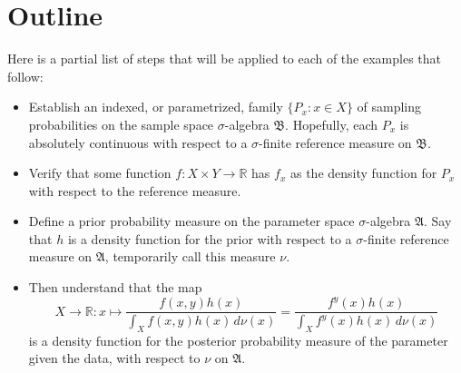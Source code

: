 \documentclass[
twoside=true,
paper=letter,
fontsize=9pt,
pagesize=auto,
leqno,
openany,
headsepline,
overfullrule,
]{scrbook}
\theoremstyle{plain}
\theoremstyle{plain}
\theoremstyle{definition}
\theoremstyle{bfnoteitalic}
\theoremstyle{bfnoteroman}
\newcommand{\sigalg}[1]{\mathfrak{#1}}
\newcommand{\textsigma}{\hbox{\large{$\sigma$}}\kern-1pt}
\newcommand{\R}{\mathbb{R}}
\newcommand{\funcf}{f}
\newcommand{\funch}{h}
\newcommand{\function}{f}
\newcommand{\functioniii}{h}
\newcommand{\measurespace}{X}
\newcommand{\measurespaceii}{Y}
\newcommand{\measureii}{\nu}
\newcommand{\measnu}{\nu}
\newcommand{\pspace}{\measurespace}%
\newcommand{\sspace}{\measurespaceii}%
\newcommand{\pspaceelt}{x}
\newcommand{\sspaceelt}{y}
\newcommand{\sspacesig}{\sigalg{B}}
\newcommand{\pspacesig}{\sigalg{A}}
\begin{document}
\section{Outline}
Here is a partial list of steps that will be applied to each of the examples that follow:
\begin{itemize}
\item
Establish an indexed, or parametrized, family
$\{ P_\pspaceelt :\pspaceelt\in\pspace \}$
of sampling probabilities on the sample space \textsigma-algebra 
$\sspacesig$. Hopefully, each
$P_\pspaceelt$
is absolutely continuous with respect to a \textsigma-finite reference measure on $\sspacesig$.
\item
Verify that some function
$\function : \pspace\times\sspace\to\R$
has $\funcf_\pspaceelt$ as  the density function for
$P_\pspaceelt$ with respect to the reference measure.
\item
Define a prior probability measure on the parameter space \textsigma-algebra
$\pspacesig$.
Say that $\funch$ is a density function for the prior with respect to a \textsigma-finite reference measure on $\pspacesig$, temporarily call this measure $\measnu$.
\item
Then understand that the map
\[
\pspace\to\R:
\pspaceelt
\mapsto
\frac{\function(\pspaceelt,\sspaceelt)\functioniii(\pspaceelt)}
{\displaystyle
\int_{\pspace} \function(\pspaceelt,\sspaceelt)\functioniii(\pspaceelt)
\,d\measureii(\pspaceelt)}
=
\frac{\function^\sspaceelt(\pspaceelt)\functioniii(\pspaceelt)}
{\displaystyle
\int_{\pspace} \function^\sspaceelt(\pspaceelt)\functioniii(\pspaceelt)
\,d\measureii(\pspaceelt)}
\]
is a density function for the posterior probability measure of the parameter given the data,
with respect to $\measnu$ on $\pspacesig$.
\end{itemize}



\end{document}
